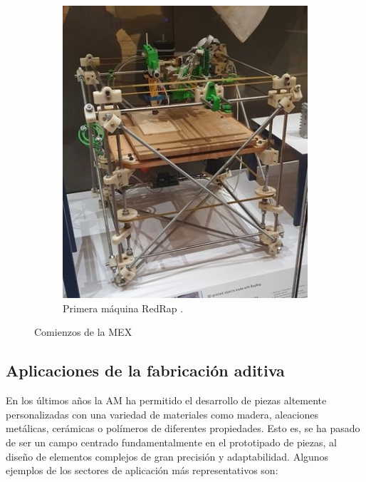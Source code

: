 \begin{figure}[h!]
\begin{subfigure}[h]{0.45\linewidth}
        \includegraphics[scale=0.3]{figuras/maquina_redrap1.jpg}
        \caption{Primera máquina RedRap \cite{web_RedRap}.}
        \label{fig:maquina_redrap1}
    \end{subfigure}
    \caption{Comienzos de la \acrshort{MEX}}
    \label{fig:FDM_y_redrap}
\end{figure}

\subsection{Aplicaciones de la fabricación aditiva}
En los últimos años la \acrshort{AM} ha permitido el desarrollo de piezas altemente personalizadas con una variedad de materiales como madera, aleaciones metálicas, cerámicas o polímeros de diferentes propiedades. Esto es, se ha pasado de ser un campo centrado fundamentalmente en el prototipado de piezas, al diseño de elementos complejos de gran precisión y adaptabilidad. Algunos ejemplos de los sectores de aplicación más representativos son:

